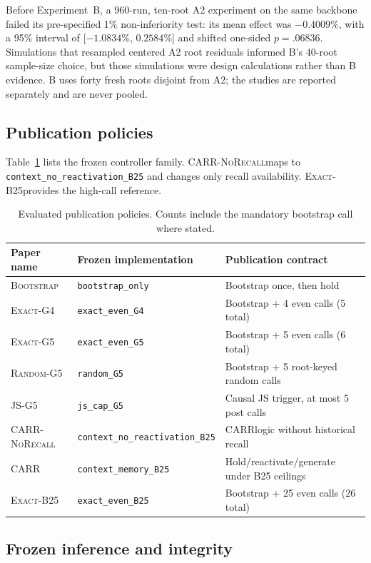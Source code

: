\documentclass[sigconf,anonymous,review]{acmart}
\newcommand{\carr}{\textsc{CARR}}
\newcommand{\norecall}{\textsc{CARR-NoRecall}}
\newcommand{\bbootstrap}{\textsc{Bootstrap}}
\newcommand{\exactfour}{\textsc{Exact-G4}}
\newcommand{\exactfive}{\textsc{Exact-G5}}
\newcommand{\randomfive}{\textsc{Random-G5}}
\newcommand{\jsfive}{\textsc{JS-G5}}
\newcommand{\exactdense}{\textsc{Exact-B25}}
\begin{document}
Before Experiment~B, a 960-run, ten-root A2 experiment on the same backbone
failed its pre-specified 1\% non-inferiority test: its mean effect was
$-0.4009\%$, with a 95\% interval of [$-1.0834\%$, $0.2584\%$] and shifted
one-sided $p=.06836$. Simulations that resampled centered A2 root residuals
informed B's 40-root sample-size choice, but those simulations were design
calculations rather than B evidence. B uses forty fresh roots disjoint from A2;
the studies are reported separately and are never pooled.

\subsection{Publication policies}

Table~\ref{tab:policies} lists the frozen controller family. \norecall maps to
\texttt{context\_no\_reactivation\_B25} and changes only recall availability.
\exactdense provides the high-call reference.

\begin{table}[t]
\caption{Evaluated publication policies. Counts include the mandatory
bootstrap call where stated.}
\label{tab:policies}
\centering
\small
\begin{tabular}{lll}
\toprule
Paper name & Frozen implementation & Publication contract \\
\midrule
\bbootstrap & \texttt{bootstrap\_only} & Bootstrap once, then hold \\
\exactfour & \texttt{exact\_even\_G4} & Bootstrap + 4 even calls (5 total) \\
\exactfive & \texttt{exact\_even\_G5} & Bootstrap + 5 even calls (6 total) \\
\randomfive & \texttt{random\_G5} & Bootstrap + 5 root-keyed random calls \\
\jsfive & \texttt{js\_cap\_G5} & Causal JS trigger, at most 5 post calls \\
\norecall & \texttt{context\_no\_reactivation\_B25} & \carr logic without historical recall \\
\carr & \texttt{context\_memory\_B25} & Hold/reactivate/generate under B25 ceilings \\
\exactdense & \texttt{exact\_even\_B25} & Bootstrap + 25 even calls (26 total) \\
\bottomrule
\end{tabular}
\end{table}

\subsection{Frozen inference and integrity}
\end{document}
